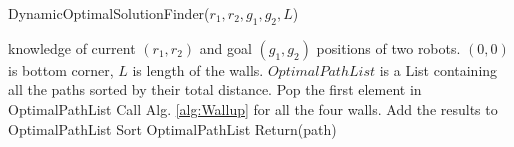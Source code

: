 \begin{algorithm}
\caption{DynamicOptimalSolutionFinder($r_1,r_2,g_1,g_2,L$)}\label{alg:optimalAlg}
\begin{algorithmic}[1]
\Require knowledge of current $(r_1,r_2)$ and goal $(g_1,g_2)$ positions of  two robots. 
$(0,0)$ is bottom corner,
 $L$ is length of the walls. 
 $OptimalPathList$ is a List containing all the paths sorted by their total distance. 
\State Pop the first element in OptimalPathList
\State Call Alg. \ref{alg:Wallup} for all the four walls.
\State Add the results to OptimalPathList
\State Sort OptimalPathList
\EndWhile
\State Return(path)
\end{algorithmic}
\end{algorithm}







